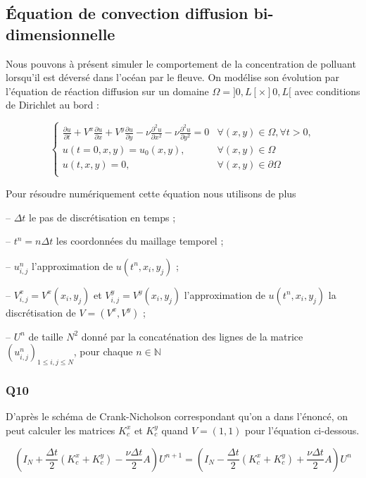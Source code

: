 \documentclass[titlepage,11pt,a4paper]{article}
\begin{document}
\subsection{Équation de convection diffusion bi-dimensionnelle}
Nous pouvons à présent simuler le comportement de la concentration de polluant lorsqu'il est déversé dans l'océan par le fleuve. On modélise son évolution par l'équation de réaction diffusion sur un domaine $\Omega =]0, L[\times]0, L[$ avec conditions de Dirichlet au bord :

\begin{equation}
\left\{
\begin{array}{lll}
\displaystyle\frac{\partial u}{\partial t} + V^x \displaystyle\frac{\partial u}{\partial x} + V^y \displaystyle\frac{\partial u}{\partial y}-\nu\displaystyle\frac{\partial^2 u}{\partial x^2} -\nu\displaystyle\frac{\partial^2 u}{\partial y^2}= 0 & \forall (x, y) \in \Omega, \forall t > 0,\\
u(t=0, x, y) = u_0(x,y), & \forall (x,y) \in \Omega\\
u(t, x, y) = 0, & \forall (x,y) \in \partial\Omega\\
\end{array}
\right.
\label{equ:equation_de_laplace_temps}
\end{equation}

Pour résoudre numériquement cette équation nous utilisons de plus

-- $\Delta t$ le pas de discrétisation en temps ;

-- $t^n = n\Delta t$ les coordonnées du maillage temporel ;

-- $u^n_{i,j}$ l'approximation de $u(t^n, x_i, y_j)$ ;

-- $V^x_{i,j} = V^x(x_i,y_j)$ et $V^y_{i,j} = V^y(x_i,y_j)$ l'approximation de $u(t^n, x_i, y_j)$ la discrétisation de $V = (V^x, V^y)$ ;

-- $U^n$ de taille $N^2$ donné par la concaténation des lignes de la matrice $(u^n_{i,j})_{1\leq i, j \leq N}$, pour chaque $n\in \mathbb{N}$

\subsubsection{Q10}
D'après le schéma de Crank-Nicholson correspondant qu'on a dans l'énoncé, on peut calculer les matrices $K^x_c$ et $K^y_c$ quand $V = (1,1)$ pour l'équation ci-dessous.

\begin{equation}
(I_N + \frac{\Delta t}{2}(K_c^x + K^y_c) - \frac{\nu \Delta t}{2}A)U^{n+1} = (I_N - \frac{\Delta t}{2}(K_c^x + K^y_c) + \frac{\nu \Delta t}{2}A)U^{n}
\label{equ:relation_recurrence}
\end{equation}
\end{document}
